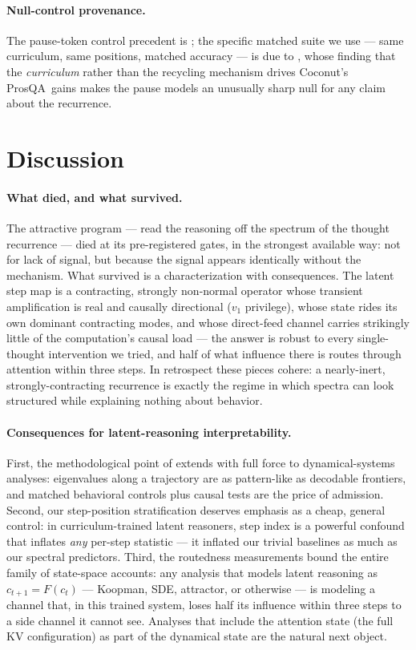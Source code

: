 \documentclass[11pt]{article}
\newcommand{\prosqa}{ProsQA}
\begin{document}
\paragraph{Null-control provenance.} The pause-token control precedent is
\citet{goyal2024pause}; the specific matched suite we use --- same curriculum, same
positions, matched accuracy --- is due to \citet{martin2026curriculum}, whose finding
that the \emph{curriculum} rather than the recycling mechanism drives Coconut's \prosqa\
gains makes the pause models an unusually sharp null for any claim about the recurrence.

\section{Discussion}
\label{sec:discussion}

\paragraph{What died, and what survived.} The attractive program --- read the
reasoning off the spectrum of the thought recurrence --- died at its
pre-registered gates, in the strongest available way: not for lack of signal, but
because the signal appears identically without the mechanism. What survived is a
characterization with consequences. The latent step map is a contracting,
strongly non-normal operator whose transient amplification is real and causally
directional ($v_1$ privilege), whose state rides its own dominant contracting
modes, and whose direct-feed channel carries strikingly little of the
computation's causal load --- the answer is robust to every single-thought
intervention we tried, and half of what influence there is routes through
attention within three steps. In retrospect these pieces cohere: a nearly-inert,
strongly-contracting recurrence is exactly the regime in which spectra can look
structured while explaining nothing about behavior.

\paragraph{Consequences for latent-reasoning interpretability.} First, the
methodological point of \citet{aswal2026observable} extends with full force to
dynamical-systems analyses: eigenvalues along a trajectory are as pattern-like as
decodable frontiers, and matched behavioral controls plus causal tests are the
price of admission. Second, our step-position stratification deserves emphasis as
a cheap, general control: in curriculum-trained latent reasoners, step index is a
powerful confound that inflates \emph{any} per-step statistic --- it inflated our
trivial baselines as much as our spectral predictors. Third, the routedness
measurements bound the entire family of state-space accounts: any analysis that
models latent reasoning as $c_{t+1}=F(c_t)$ --- Koopman, SDE, attractor, or
otherwise --- is modeling a channel that, in this trained system, loses half its
influence within three steps to a side channel it cannot see. Analyses that
include the attention state (the full KV configuration) as part of the dynamical
state are the natural next object.
\end{document}
